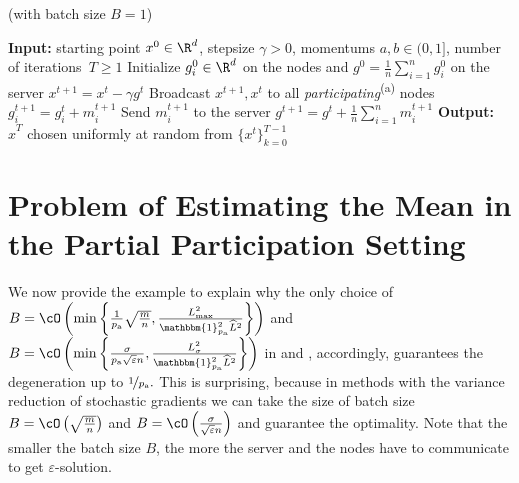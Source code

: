 \documentclass{article}
\newcommand{\algorithmname}{DASHA-PP}
\newcommand*{\probavailable}{\ensuremath{p_{\textnormal{a}}}}
\begin{document}
\begin{algorithm*}
  \caption{ (with batch size $B = 1$)}
  \label{alg:main_algorithm_dasha_mvr}
  \begin{algorithmic}[1]
  \STATE \textbf{Input:} starting point $x^0 \in \R^d$, stepsize $\gamma > 0$, momentums $a, b \in (0, 1]$, 
  number of iterations~$T \geq 1$
  \STATE Initialize $g^0_i\in \R^d$ on the nodes and  $g^0 = \frac{1}{n}\sum_{i=1}^n g^0_i$ on the server
  \STATE $x^{t+1} = x^t - \gamma g^t$  
  \STATE Broadcast $x^{t+1}, x^{t}$ to all \textit{participating}\textsuperscript{\red (a)} nodes
  \STATE $g^{t+1}_i = g^{t}_i + m^{t+1}_i$
  \STATE Send $m^{t+1}_i$ to the server
  \ENDFOR
  \STATE $g^{t+1} = g^t + \frac{1}{n} \sum_{i=1}^n m^{t+1}_i$
  \ENDFOR
  \STATE \textbf{Output:} $\hat{x}^T$ chosen uniformly at random from $\{x^t\}_{k=0}^{T-1}$ 
  \end{algorithmic}
\end{algorithm*}

\newpage

\section{Problem of Estimating the Mean in the Partial Participation Setting}
\label{sec:partial_participation_sampling}
We now provide the example to explain why the only choice of $B = \cO\left(\min\left\{\frac{1}{\probavailable}\sqrt{\frac{m}{n}},\frac{L_{\max}^2}{\mathbbm{1}_{\probavailable}^2 \widehat{L}^2}\right\}\right)$ and $B = \cO\left(\min\left\{\frac{\sigma}{\probavailable \sqrt{\varepsilon} n}, \frac{L_{\sigma}^2}{\mathbbm{1}_{\probavailable}^2 \widehat{L}^2}\right\}\right)$ in \algname{\algorithmname-PAGE} and \algname{\algorithmname-MVR}, accordingly, guarantees the degeneration up to $\nicefrac{1}{\probavailable}.$ This is surprising, because in methods with the variance reduction of stochastic gradients \citep{PAGE, tyurin2022dasha} we can take the size of batch size $B = \cO\left(\sqrt{\frac{m}{n}}\right)$ and $B = \cO\left(\frac{\sigma}{\sqrt{\varepsilon} n}\right)$ and guarantee the optimality. Note that the smaller the batch size $B$, the more the server and the nodes have to communicate to get $\varepsilon$-solution.
\end{document}
